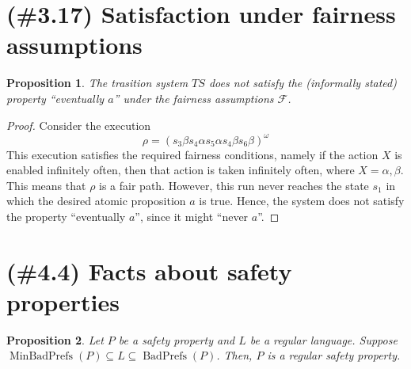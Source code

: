 \documentclass[letterpaper,11pt]{article}
\newtheorem{prop}{Proposition}
\DeclareMathOperator{\MBP}{MinBadPrefs}
\DeclareMathOperator{\BP}{BadPrefs}
\begin{document}
\section{(\#3.17) Satisfaction under fairness assumptions}

\begin{prop}
    The trasition system $TS$ does not satisfy the (informally stated) property
    ``eventually $a$'' under the fairness assumptions $\mathcal{F}$.
\end{prop}

\begin{proof}
    Consider the execution
    \begin{equation*}
        \rho = (s_3 \beta s_4 \alpha s_5 \alpha s_4 \beta s_6 \beta)^\omega
    \end{equation*}
    This execution satisfies the required fairness conditions, namely if
    the action $X$ is enabled infinitely often, then that action is taken
    infinitely often, where $X = \alpha, \beta$. This means that $\rho$ is a
    fair path. However, this run never reaches the state $s_1$ in which the
    desired atomic proposition $a$ is true. Hence, the system does not satisfy
    the property ``eventually $a$'', since it might ``never $a$''.
\end{proof}

\section{(\#4.4) Facts about safety properties}

\begin{prop}
    Let $P$ be a safety property and $L$ be a regular language. Suppose
    $\MBP(P) \subseteq L \subseteq \BP(P)$. Then, $P$ is a regular safety
    property.
\end{prop}
\end{document}
